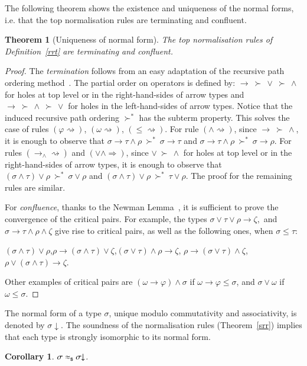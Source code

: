 \documentclass[UKenglish]{eptcs}
\newtheorem{corollary}[fact]{Corollary}
\newtheorem{theorem}[fact]{Theorem}
\newcommand{\tA}{\sigma}       \newcommand{\tB}{\tau}
\newcommand{\tC}{\rho}
\newcommand{\tD}{\zeta}
\newcommand{\tu}{\omega}
\newcommand{\tS}{\sigma}       \newcommand{\tT}{\tau}
\newcommand{\tR}{\rho}
\newcommand{\labelx}[1]{\label{#1}}
\newcommand{\isos}{\approx_{\sf s}}
\newcommand{\nf}[1]{#1\!\!\downarrow}
\newcommand{\myformula}[1]{\\[0.5pt]\centerline{#1}}
\newcommand{\rr}{\Rightarrow}
\begin{document}
\smallskip

The following theorem shows the existence and uniqueness of the normal forms, i.e. that the top normalisation rules are terminating and confluent.


\begin{theorem} [Uniqueness of normal form]\labelx{uni}
The top normalisation rules of Definition~\ref{rrt} are terminating and confluent.
\end{theorem}
\begin{proof}The {\em termination} follows from an easy adaptation of the recursive path ordering method~\cite{D82}. The partial order on operators is defined by: $\to~\succ~\vee~\succ~\wedge$ for  holes at top level or in the right-hand-sides of arrow types and  $\to~\succ~\wedge~\succ~\vee$ for holes in the left-hand-sides of arrow types. Notice that the induced recursive path ordering $\succ^*$ has the subterm property. This solves the case of rules $(\varphi\rightsquigarrow)$, $(\tu\rightsquigarrow)$, $(\leq\rightsquigarrow)$.
For
rule $(\wedge \rightsquigarrow)$, since $\to~\succ~\wedge$, it is enough to observe that $\tS\to\tT\wedge\tR~\succ^*~\tS\to\tT$ and        $\tS\to\tT\wedge\tR~\succ^*~\tS\to\tR$.
For rules $(\to_\wedge\rightsquigarrow)$ and $(\vee\wedge\rr)$, since $\vee~\succ~\wedge$ for holes at top level or in the right-hand-sides of arrow types, it is enough to observe that $(\tS\wedge\tT)\vee\tR~\succ^*~\tS\vee\tR$ and        $(\tS\wedge\tT)\vee\tR~\succ^*~\tT\vee\tR$. The proof for the remaining rules are similar.

 For {\em confluence}, thanks to the Newman Lemma~\cite{N42}, it is sufficient to  prove  the convergence of the critical
 pairs. For example, the  types $\tA\vee\tB\vee\tC\to\tD,$ and $\tA\to\tB\wedge\tC\wedge\tD$ give rise to critical pairs, as well as the following ones, when $\tA\leq\tB$:
 \myformula{ $(\tA\wedge\tB)\vee \tC $,\qquad $ \tC \to
(\tA\wedge\tB) \vee \tD$,\qquad $(\tA\vee\tB) \wedge \tC \to \tD$, \qquad
$ \tC \to
(\tA \vee\tB)\wedge\tD$,\qquad$\tC \vee (\tA\wedge\tB)\to \tD$.
}
Other examples of critical pairs are
$(\omega\to\varphi)\wedge\sigma$ if $\omega\to\varphi\leq\sigma$, and $\sigma\vee\omega$ if $\omega\leq\sigma.
$\end{proof}


The
normal form of a type $\tS$, unique modulo commutativity and associativity, is denoted by $\nf{\tS}$. The soundness of the normalisation rules (Theorem~\ref{srr}) implies that each type is strongly isomorphic to its normal form.
\begin{corollary}\label{inf} $\tA\isos\nf\tA$.
\end{corollary}
\end{document}
